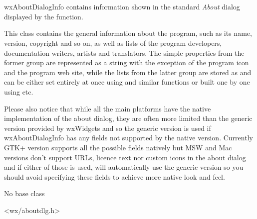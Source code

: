 
\section{}\label{wxaboutdialoginfo}

wxAboutDialogInfo contains information shown in the standard \textit{About}
dialog displayed by the  function.

This class contains the general information about the program, such as its
name, version, copyright and so on, as well as lists of the program developers,
documentation writers, artists and translators. The simple properties from the
former group are represented as a string with the exception of the program icon
and the program web site, while the lists from the latter group are stored as 
 and can be either set entirely at once
using  and similar
functions or built one by one using  
etc.

Please also notice that while all the main platforms have the native
implementation of the about dialog, they are often more limited than the
generic version provided by wxWidgets and so the generic version is used if
wxAboutDialogInfo has any fields not supported by the native version. Currently
GTK+ version supports all the possible fields natively but MSW and Mac versions
don't support URLs, licence text nor custom icons in the about dialog and if
either of those is used,  will automatically
use the generic version so you should avoid specifying these fields to achieve
more native look and feel.


No base class


<wx/aboutdlg.h>




